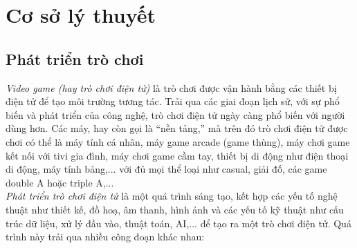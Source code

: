 \section{Cơ sở lý thuyết}
\subsection{Phát triển trò chơi}
\hspace*{0.5cm} \textit{Video game (hay trò chơi điện tử)} là trò chơi được vận hành bằng các thiết bị điện tử để tạo môi trường tương tác. Trải qua các giai đoạn lịch sử, với sự phổ biến và phát triển của công nghệ, trò chơi điện tử ngày càng phổ biến với người dùng hơn. Các máy, hay còn gọi là “nền tảng,” mà trên đó trò chơi điện tử được chơi có thể là máy tính cá nhân, máy game arcade (game thùng), máy chơi game kết nối với tivi gia đình, máy chơi game cầm tay, thiết bị di động như điện thoại di động, máy tính bảng,... với đủ mọi thể loại như casual, giải đố, các game double A hoặc triple A,...\\
\hspace*{0.5cm} \textit{Phát triển trò chơi điện tử} là một  quá trình sáng tạo, kết hợp các yếu tố nghệ thuật như thiết kế, đồ hoạ, âm thanh, hình ảnh và các yếu tố kỹ thuật như cấu trúc dữ liệu, xử lý đầu vào, thuật toán, AI,... để tạo ra một trò chơi điện tử. Quá trình này trải qua nhiều công đoạn khác nhau:\\
